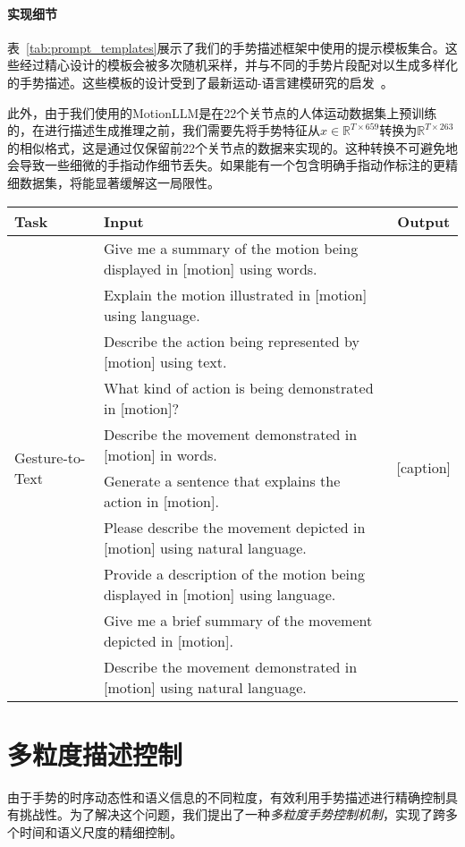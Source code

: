\paragraph{实现细节}
表~\ref{tab:prompt_templates}展示了我们的手势描述框架中使用的提示模板集合。这些经过精心设计的模板会被多次随机采样，并与不同的手势片段配对以生成多样化的手势描述。这些模板的设计受到了最新运动-语言建模研究的启发~\cite{jiang2024motiongpt}。

此外，由于我们使用的MotionLLM是在22个关节点的人体运动数据集上预训练的，在进行描述生成推理之前，我们需要先将手势特征从$x\in \mathbb{R}^{T\times 659}$转换为$\mathbb{R}^{T\times 263}$的相似格式，这是通过仅保留前22个关节点的数据来实现的。这种转换不可避免地会导致一些细微的手指动作细节丢失。如果能有一个包含明确手指动作标注的更精细数据集，将能显著缓解这一局限性。

\begin{table*}[t]
\centering
\caption{手势描述框架中使用的提示模板示例。}
\footnotesize
\label{tab:prompt_templates}
\begin{tabular}{llc}
\toprule
Task & Input & Output \\
\midrule
\multirow{10}{*}{Gesture-to-Text} & Give me a summary of the motion being displayed in [motion] using words. & \multirow{10}{*}{[caption]} \\
& Explain the motion illustrated in [motion] using language. & \\
& Describe the action being represented by [motion] using text. & \\
& What kind of action is being demonstrated in [motion]? & \\
& Describe the movement demonstrated in [motion] in words. & \\
& Generate a sentence that explains the action in [motion]. & \\
& Please describe the movement depicted in [motion] using natural language. & \\
& Provide a description of the motion being displayed in [motion] using language. & \\
& Give me a brief summary of the movement depicted in [motion]. & \\
& Describe the movement demonstrated in [motion] using natural language. & \\
\bottomrule
\end{tabular}
\end{table*}

\section{多粒度描述控制}
\label{sec:method:control}
由于手势的时序动态性和语义信息的不同粒度，有效利用手势描述进行精确控制具有挑战性。为了解决这个问题，我们提出了一种\textit{多粒度手势控制机制}，实现了跨多个时间和语义尺度的精细控制。

